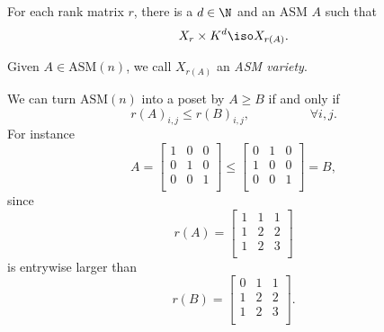 \documentclass[co439]{subfiles}
\begin{document}
    \rruleline
    
    \begin{theorem}{}
        For each rank matrix $r$, there is a $d\in\N$ and an ASM $A$ such that
        \begin{equation*}
            X_r\times K^d\iso X_{r\left( A \right)}.
        \end{equation*}
    \end{theorem}

    \rruleline

    \np Given $A\in\text{ASM}\left( n \right)$, we call $X_{r\left( A \right)}$ an \emph{ASM variety}.

    \np We can turn $\text{ASM}\left( n \right)$ into a poset by $A\geq B$ if and only if
    \begin{equation*}
        r\left( A \right)_{i,j} \leq r\left( B \right)_{i,j} , \hspace{2cm}\forall i,j.
    \end{equation*}
    For instance
    \begin{equation*}
        A = 
        \begin{bmatrix}
        	1 & 0 & 0 \\
        	0 & 1 & 0 \\
        	0 & 0 & 1 \\
        \end{bmatrix} \leq
        \begin{bmatrix}
        	0 & 1 & 0 \\
        	1 & 0 & 0 \\
        	0 & 0 & 1 \\
        \end{bmatrix}
        = B,
    \end{equation*}
    since
    \begin{equation*}
        r\left( A \right) = 
        \begin{bmatrix}
        	1 & 1 & 1 \\
        	1 & 2 & 2 \\
        	1 & 2 & 3 \\
        \end{bmatrix}
    \end{equation*}
    is entrywise larger than
    \begin{equation*}
        r\left( B \right) =
        \begin{bmatrix}
        	0 & 1 & 1 \\
        	1 & 2 & 2 \\
        	1 & 2 & 3 \\
        \end{bmatrix}.
    \end{equation*}
    
\end{document}
